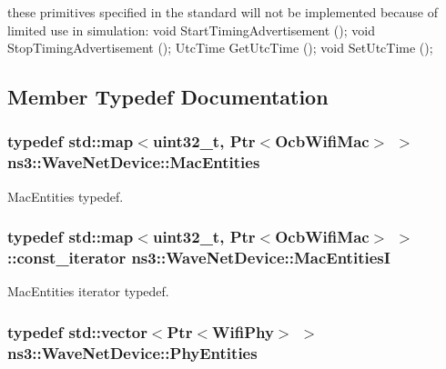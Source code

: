 these primitives specified in the standard will not be implemented because of limited use in simulation\+: void Start\+Timing\+Advertisement (); void Stop\+Timing\+Advertisement (); Utc\+Time Get\+Utc\+Time (); void Set\+Utc\+Time (); 

\subsection{Member Typedef Documentation}
\subsubsection[{\texorpdfstring{Mac\+Entities}{MacEntities}}]{\setlength{\rightskip}{0pt plus 5cm}typedef std\+::map$<$uint32\+\_\+t, {\bf Ptr}$<${\bf Ocb\+Wifi\+Mac}$>$ $>$ {\bf ns3\+::\+Wave\+Net\+Device\+::\+Mac\+Entities}\hspace{0.3cm}{\ttfamily [private]}}\hypertarget{classns3_1_1WaveNetDevice_aa9993b2c252f7ffb8bf802c8f708359d}{}\label{classns3_1_1WaveNetDevice_aa9993b2c252f7ffb8bf802c8f708359d}


Mac\+Entities typedef. 

\subsubsection[{\texorpdfstring{Mac\+EntitiesI}{MacEntitiesI}}]{\setlength{\rightskip}{0pt plus 5cm}typedef std\+::map$<$uint32\+\_\+t, {\bf Ptr}$<${\bf Ocb\+Wifi\+Mac}$>$ $>$\+::const\+\_\+iterator {\bf ns3\+::\+Wave\+Net\+Device\+::\+Mac\+EntitiesI}\hspace{0.3cm}{\ttfamily [private]}}\hypertarget{classns3_1_1WaveNetDevice_a6511363042ad221a19c4cda0d328e0fc}{}\label{classns3_1_1WaveNetDevice_a6511363042ad221a19c4cda0d328e0fc}


Mac\+Entities iterator typedef. 

\subsubsection[{\texorpdfstring{Phy\+Entities}{PhyEntities}}]{\setlength{\rightskip}{0pt plus 5cm}typedef std\+::vector$<${\bf Ptr}$<${\bf Wifi\+Phy}$>$ $>$ {\bf ns3\+::\+Wave\+Net\+Device\+::\+Phy\+Entities}\hspace{0.3cm}{\ttfamily [private]}}\hypertarget{classns3_1_1WaveNetDevice_a3f2285fdbb8db9d733db91e55ebd8b43}{}\label{classns3_1_1WaveNetDevice_a3f2285fdbb8db9d733db91e55ebd8b43}


